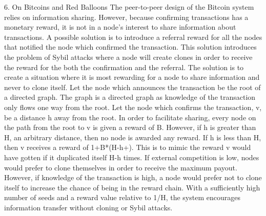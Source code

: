 
6.  On Bitcoins and Red Balloons
The peer-to-peer design of the Bitcoin system relies on information sharing.  However, because confirming transactions has a monetary reward, it is not in a node’s interest to share information about transactions.  A possible solution is to introduce a referral reward for all the nodes that notified the node which confirmed the transaction.  This solution introduces the problem of Sybil attacks where a node will create clones in order to receive the reward for the both the confirmation and the referral.  The solution is to create a situation where it is most rewarding for a node to share information and never to clone itself.  Let the node which announces the transaction be the root of a directed graph.  The graph is a directed graph as knowledge of the transaction only flows one way from the root.  Let the node which confirms the transaction, v, be a distance h away from the root.  In order to facilitate sharing, every node on the path from the root to v is given a reward of B.  However, if h is greater than H, an arbitrary distance, then no node is awarded any reward.  If h is less than H, then v receives a reward of 1+B*(H-h+).  This is to mimic the reward v would have gotten if it duplicated itself H-h times.  If external competition is low, nodes would prefer to clone themselves in order to receive the maximum payout.  However, if knowledge of the transaction is high, a node would prefer not to clone itself to increase the chance of being in the reward chain.  With a sufficiently high number of seeds and a reward value relative to 1/H, the system encourages information transfer without cloning or Sybil attacks.

